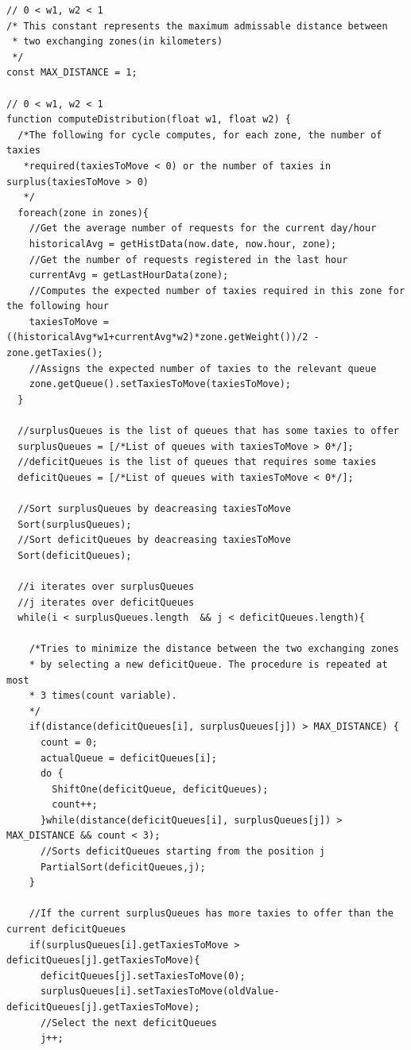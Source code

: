 \documentclass[11pt,titlepage]{article} %
\begin{document}
\begin{lstlisting}
// 0 < w1, w2 < 1
/* This constant represents the maximum admissable distance between
 * two exchanging zones(in kilometers)
 */
const MAX_DISTANCE = 1;

// 0 < w1, w2 < 1
function computeDistribution(float w1, float w2) {
  /*The following for cycle computes, for each zone, the number of taxies
   *required(taxiesToMove < 0) or the number of taxies in surplus(taxiesToMove > 0)
   */
  foreach(zone in zones){
    //Get the average number of requests for the current day/hour
    historicalAvg = getHistData(now.date, now.hour, zone);
    //Get the number of requests registered in the last hour
    currentAvg = getLastHourData(zone);
    //Computes the expected number of taxies required in this zone for the following hour
    taxiesToMove = ((historicalAvg*w1+currentAvg*w2)*zone.getWeight())/2 - zone.getTaxies();
    //Assigns the expected number of taxies to the relevant queue
    zone.getQueue().setTaxiesToMove(taxiesToMove);
  }

  //surplusQueues is the list of queues that has some taxies to offer
  surplusQueues = [/*List of queues with taxiesToMove > 0*/];
  //deficitQueues is the list of queues that requires some taxies
  deficitQueues = [/*List of queues with taxiesToMove < 0*/];

  //Sort surplusQueues by deacreasing taxiesToMove
  Sort(surplusQueues);
  //Sort deficitQueues by deacreasing taxiesToMove
  Sort(deficitQueues);

  //i iterates over surplusQueues
  //j iterates over deficitQueues
  while(i < surplusQueues.length  && j < deficitQueues.length){

    /*Tries to minimize the distance between the two exchanging zones
    * by selecting a new deficitQueue. The procedure is repeated at most
    * 3 times(count variable).
    */
    if(distance(deficitQueues[i], surplusQueues[j]) > MAX_DISTANCE) {
      count = 0;
      actualQueue = deficitQueues[i];
      do {
        ShiftOne(deficitQueue, deficitQueues);
        count++;
      }while(distance(deficitQueues[i], surplusQueues[j]) > MAX_DISTANCE && count < 3);
      //Sorts deficitQueues starting from the position j
      PartialSort(deficitQueues,j);
    }

    //If the current surplusQueues has more taxies to offer than the current deficitQueues
    if(surplusQueues[i].getTaxiesToMove > deficitQueues[j].getTaxiesToMove){
      deficitQueues[j].setTaxiesToMove(0);
      surplusQueues[i].setTaxiesToMove(oldValue-deficitQueues[j].getTaxiesToMove);
      //Select the next deficitQueues
      j++;


\end{lstlisting}
\end{document}
